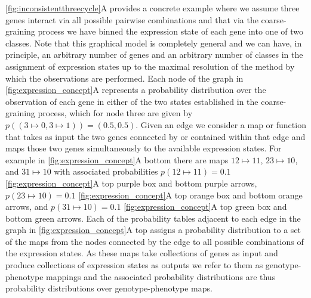 \ref{fig:inconsistentthreecycle}A provides a concrete example where we assume three genes interact via all possible pairwise combinations and that via the coarse-graining process we have binned the expression state of each gene into one of two classes. Note that this graphical model is completely general and we can have, in principle, an arbitrary number of genes and an arbitrary number of classes in the assignment of expression states up to the maximal resolution of the method by which the observations are performed. Each node of the graph in \ref{fig:expression_concept}A represents a probability distribution over the observation of each gene in either of the two states established in the coarse-graining process, which for node three are given by $p((3 \mapsto 0, 3 \mapsto 1))=(0.5,0.5)$. Given an edge we consider a map or function that takes as input the two genes connected by or contained within that edge and maps those two genes simultaneously to the available expression states. For example in \ref{fig:expression_concept}A bottom there are maps $12 \mapsto 11$, $23 \mapsto 10$, and $31 \mapsto 10$ with associated probabilities $p(12 \mapsto 11)=0.1$ \ref{fig:expression_concept}A top purple box and bottom purple arrows, $p(23 \mapsto 10)=0.1$ \ref{fig:expression_concept}A top orange box and bottom orange arrows, and $p(31 \mapsto 10)=0.1$ \ref{fig:expression_concept}A top green box and bottom green arrows. Each of the probability tables adjacent to each edge in the graph in \ref{fig:expression_concept}A top assigns a probability distribution to a set of the maps from the nodes connected by the edge to all possible combinations of the expression states. As these maps take collections of genes as input and produce collections of expression states as outputs we refer to them as genotype-phenotype mappings and the associated probability distributions are thus probability distributions over genotype-phenotype maps.

